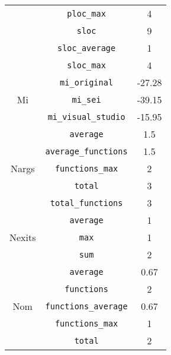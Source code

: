 \begin{center}
\begin{tabular}{ |c|c|c| }
          & \verb|ploc_max|                       & 4          \\
          & \verb|sloc|                           & 9          \\
          & \verb|sloc_average|                   & 1          \\
          & \verb|sloc_max|                       & 4          \\
    \hline
    \multirow{ 3 }{6em}{ Mi }
          & \verb|mi_original|                    & -27.28     \\
          & \verb|mi_sei|                         & -39.15     \\
          & \verb|mi_visual_studio|               & -15.95     \\
    \hline
    \multirow{ 5 }{6em}{ Nargs }
          & \verb|average|                        & 1.5        \\
          & \verb|average_functions|              & 1.5        \\
          & \verb|functions_max|                  & 2          \\
          & \verb|total|                          & 3          \\
          & \verb|total_functions|                & 3          \\
    \hline
    \multirow{ 3 }{6em}{ Nexits }
          & \verb|average|                        & 1          \\
          & \verb|max|                            & 1          \\
          & \verb|sum|                            & 2          \\
    \hline
    \multirow{ 5 }{6em}{ Nom }
          & \verb|average|                        & 0.67       \\
          & \verb|functions|                      & 2          \\
          & \verb|functions_average|              & 0.67       \\
          & \verb|functions_max|                  & 1          \\
          & \verb|total|                          & 2          \\
    \hline
  \end{tabular}
\end{center}
